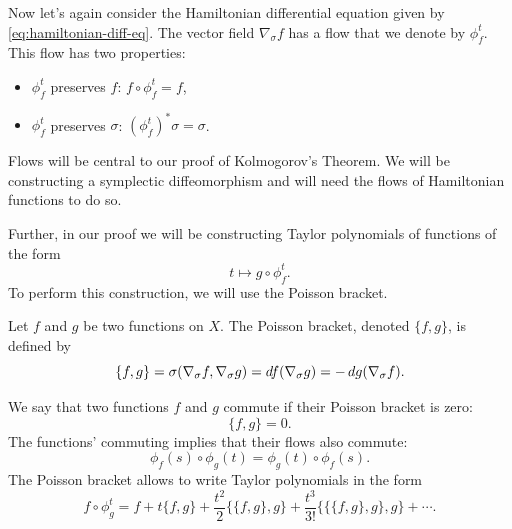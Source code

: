 \documentclass[twoside,letterpaper,11pt]{article}
\newcommand{\sgrad}{\nabla_{\sigma}}
\numberwithin{equation}{section}
\begin{document}
Now let's again consider the Hamiltonian differential equation given by
\cref{eq:hamiltonian-diff-eq}.
The vector field $\sgrad f$ has a flow that we denote by $\phi_f^t$.
This flow has two properties:
\begin{itemize}
\item $\phi_f^t$ preserves $f$: $f \circ \phi_f^t = f$,
\item $\phi_f^t$ preserves $\sigma$: $(\phi_f^t)^* \sigma = \sigma$.
\end{itemize}
Flows will be central to our proof of Kolmogorov's Theorem.
We will be constructing a symplectic diffeomorphism and will need the flows of
Hamiltonian functions to do so.

Further, in our proof we will be constructing Taylor polynomials of functions of
the form
\begin{equation*}
  t \mapsto g \circ \phi_f^t.
\end{equation*}
To perform this construction, we will use the Poisson bracket.
\begin{defn}
  Let $f$ and $g$ be two functions on $X$.
  The Poisson bracket, denoted $\{f, g\}$, is defined by
  \begin{equation*}
    \{f, g\} = \sigma(\sgrad f, \sgrad g) = \dif f(\sgrad g) = - \dif g(\sgrad
 f).
  \end{equation*}
\end{defn}
We say that two functions $f$ and $g$ commute if their Poisson bracket is zero:
\begin{equation*}
  \{f, g\} = 0.
\end{equation*}
The functions' commuting implies that their flows also commute:
\begin{equation*}
  \phi_f(s) \circ \phi_g(t) = \phi_g(t) \circ \phi_f(s).
\end{equation*}
The Poisson bracket allows to write Taylor polynomials in the form
\begin{equation*}
  f \circ \phi_g^t = f + t\{f, g\} + \frac{t^2}{2} \{\{f, g\}, g\} +
  \frac{t^3}{3!} \{ \{ \{f, g\}, g\}, g\} + \cdots.
\end{equation*}
\end{document}
